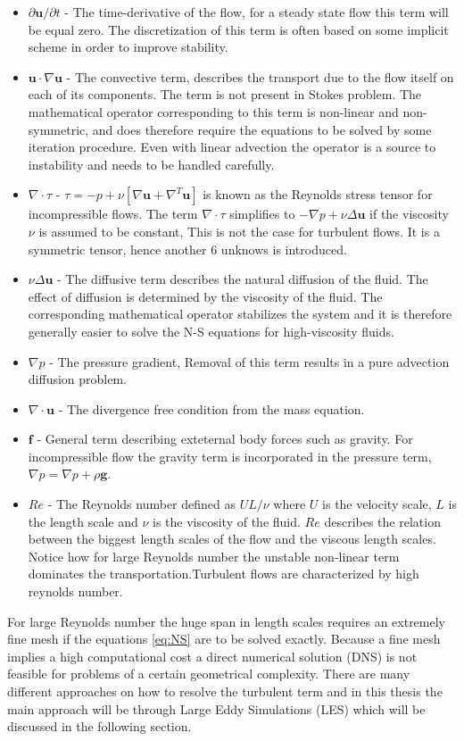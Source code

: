 \begin{itemize}
    \item $\partial \mathbf{u} /\partial t$
     - The time-derivative of the flow, for a steady state flow this term will be equal zero.
             The discretization of this term is often based on some implicit scheme in order to improve stability.  
    \item $\mathbf{u} \cdot \nabla \mathbf{u}$
     - The convective term, describes the transport due to the flow itself on each of its components. 
    The term is not present in Stokes problem.
    The mathematical operator corresponding to this term is non-linear and non-symmetric, and does therefore require the equations to be solved 
    by some iteration procedure. Even with linear advection the operator is a source to instability and needs to be handled carefully. 
\item  $\nabla \cdot \tau$ 
       - $\tau= -p + \nu[ \nabla \mathbf{u} + \nabla^T \mathbf{u}]$ is known as the Reynolds stress tensor for incompressible flows.
       The term $\nabla \cdot \tau$ simplifies to $-\nabla p + \nu \Delta \mathbf{u}$ if the viscosity $\nu$
       is assumed to be constant, This is not the case for turbulent flows.
       It is a symmetric tensor, hence another 6 unknows is introduced.
    \item $\nu \Delta \mathbf{u}$ 
    - The diffusive term describes the natural diffusion of the fluid. The effect of diffusion is determined by the 
    viscosity of the fluid. The corresponding mathematical operator stabilizes the system and it is therefore generally easier
    to solve the N-S equations for high-viscosity fluids. 
    \item $\nabla p$
    - The pressure gradient, Removal of this term results in a pure advection diffusion problem.
    \item $\nabla \cdot \mathbf{u}$ 
    - The divergence free condition from the mass equation.
\item $\mathbf{f}$ 
    - General term describing exteternal body forces such as gravity. For incompressible flow the
    gravity term is incorporated in the pressure term, $\nabla p = \nabla p + \rho \mathbf{g}$. 
    \item $Re$ 
    - The Reynolds number defined as $UL/\nu$ where $U$ is the velocity scale, $L$ is the length scale and $\nu$ 
      is the viscosity of the fluid. $Re$ describes the relation between the biggest length scales of the flow
      and the viscous length scales. Notice how for large Reynolds number the unstable non-linear term 
      dominates the transportation.Turbulent flows are characterized by high reynolds number.
\end{itemize}
For large Reynolds number the huge span in length scales requires an extremely fine mesh if the equations \ref{eq:NS} 
are to be solved exactly. Because a fine mesh implies a high computational cost a direct numerical solution (DNS) is not feasible for 
problems of a certain geometrical complexity. There are many different approaches on how to resolve the turbulent term and in 
this thesis the main approach will be through Large Eddy Simulations (LES) which will be discussed 
in the following section.
%
